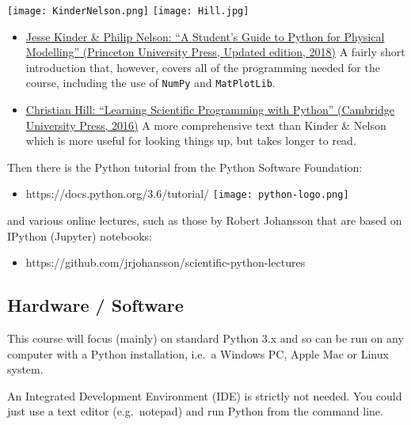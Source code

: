 \documentclass[10pt]{article}
\providecommand{\tightlist}{%
      \setlength{\itemsep}{0pt}\setlength{\parskip}{0pt}}
\begin{document}
\texttt{[image: KinderNelson.png]} \texttt{[image: Hill.jpg]}

\begin{itemize}
\item\href{https://press.princeton.edu/titles/11349.html}{Jesse Kinder \&
Philip Nelson: ``A Student's Guide to Python for Physical Modelling''
(Princeton University Press, Updated edition, 2018)} A fairly short
introduction that, however, covers all of the programming needed for the
course, including the use of \texttt{NumPy} and \texttt{MatPlotLib}.

\item\href{http://www.cambridge.org/gb/academic/subjects/physics/computational-science-and-modelling/learning-scientific-programming-python?format=PB}{Christian
Hill: ``Learning Scientific Programming with Python'' (Cambridge
University Press, 2016)} A more comprehensive text than Kinder \& Nelson
which is more useful for looking things up, but takes longer to read.
\end{itemize}

Then there is the Python tutorial from the Python Software Foundation:

\begin{itemize}
\tightlist
\item
  https://docs.python.org/3.6/tutorial/ \texttt{[image: python-logo.png]}
\end{itemize}

and various online lectures, such as those by Robert Johansson that are
based on IPython (Jupyter) notebooks:

\begin{itemize}
\tightlist
\item
  https://github.com/jrjohansson/scientific-python-lectures
\end{itemize}

    \hypertarget{hardware-software}{%
\subsection{Hardware / Software}\label{hardware-software}}

This course will focus (mainly) on standard Python 3.x and so can be run
on any computer with a Python installation, i.e.~a Windows PC, Apple Mac
or Linux system.

An Integrated Development Environment (IDE) is strictly not needed. You
could just use a text editor (e.g.~notepad) and run Python from the
command line.
\end{document}
